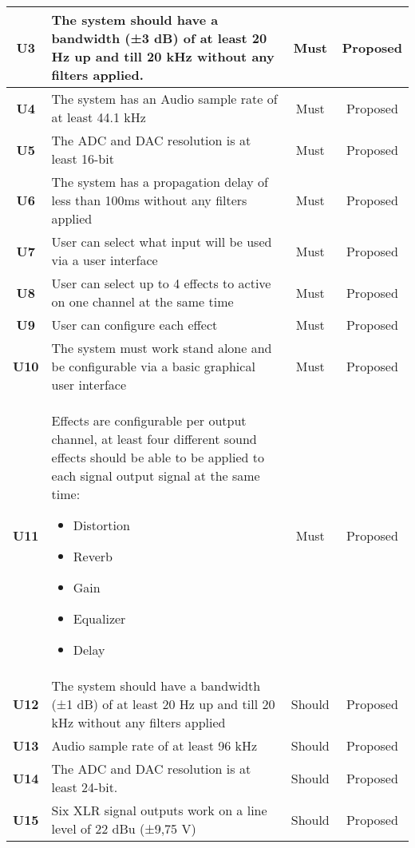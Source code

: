 \begin{longtable}{|c|p{10cm}|c|c|}
		\textbf{U3} &The system should have a bandwidth (±3 dB) of at least 20 Hz up and till 20 kHz without any filters applied. 	& Must   & Proposed\\ \hline
		\textbf{U4} &The system has an Audio sample rate of at least 44.1 kHz 														& Must   & Proposed\\ \hline
		\textbf{U5} &The ADC and DAC resolution is at least 16-bit 																	& Must   & Proposed\\ \hline
		\textbf{U6} &The system has a propagation delay of less than 100ms without any filters applied 								& Must   & Proposed\\ \hline
		\textbf{U7} &User can select what input will be used via a user interface													& Must   & Proposed\\ \hline
		\textbf{U8} &User can select up to 4 effects to active on one channel at the same time 										& Must   & Proposed\\ \hline
		\textbf{U9} &User can configure each effect 																				& Must   & Proposed\\ \hline
		\textbf{U10} &The system must work stand alone and be configurable via a basic graphical user interface 					& Must   & Proposed\\ \hline
		\textbf{U11} &Effects are configurable per output channel, at least four different sound effects should be able to be applied to each signal output signal at the same time: \newline
		\begin{itemize}
			\setlength\itemsep{-0.4em}
			\item Distortion
			\item Reverb
			\item Gain
			\item Equalizer
			\item Delay
		\end{itemize}																												& Must 	 & Proposed\\ \hline
		\textbf{U12}  &The system should have a bandwidth (±1 dB) of at least 20 Hz up and till 20 kHz without any filters applied 	& Should & Proposed\\ \hline
		\textbf{U13}  &Audio sample rate of at least 96 kHz 																		& Should & Proposed\\ \hline
		\textbf{U14} & The ADC and DAC resolution is at least 24-bit. 																& Should & Proposed\\ \hline
		\textbf{U15} & Six XLR signal outputs work on a line level of 22 dBu (±9,75 V) 												& Should & Proposed\\ \hline

\end{longtable}

